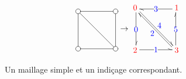 \documentclass[]{article}
\begin{document}
\begin{figure}[H]
	\[\begin{aligned}[c]
			\entrymodifiers={+[o][F]}
			\renewcommand{\labelstyle}{\textstyle}
			\xymatrix@=4em @L=.25ex{
			{}
			\ar @^{-} [d]
			\ar @^{-} [dr]
			 & {}
			\ar @^{-} [l]
			\\ {}
			\ar @^{-} [r]
			 & {}
			\ar @^{-} [u]
			}
		\end{aligned}\rightarrow\begin{aligned}[c]
			\xymatrix@=4em @L=.25ex{
			{\color{red}0}
			\ar @<.25ex> @^{->} [d] |{\color{blue}0}
			\ar @<.25ex> @^{->} [dr] ^{\color{blue}4}
			 & {\color{red}1}
			\ar @<.25ex> @^{->} [l] |{\color{blue}3}
			\\ {\color{red}2}
			\ar @<.25ex> @^{->} [r] |{\color{blue}1}
			 & {\color{red}3}
			\ar @<.25ex> @^{->} [ul] ^{\color{blue}2}
			\ar @<.25ex> @^{->} [u] |{\color{blue}5}
			}
		\end{aligned}\]
	\caption{Un maillage simple et un indiçage correspondant.}
	\label{maillage_simple}
\end{figure}
\end{document}
